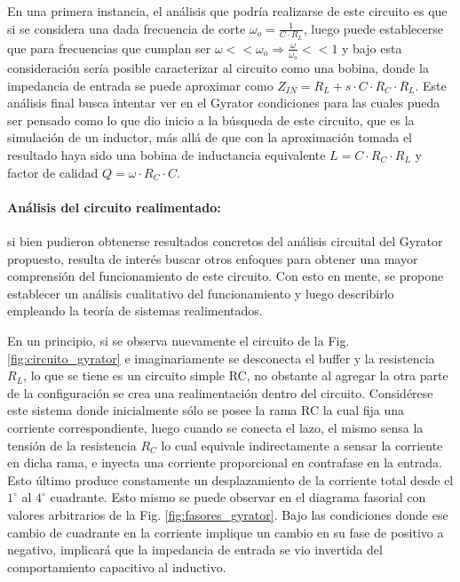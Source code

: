 En una primera instancia, el an\'alisis que podr\'ia realizarse de este circuito es que si se considera una dada frecuencia de corte 
$\omega_o = \frac{1}{C \cdot R_L}$, luego puede establecerse que para frecuencias que cumplan ser $\omega << \omega_o \Rightarrow \frac{\omega}{\omega_o} << 1$ y bajo esta consideraci\'on
ser\'ia posible caracterizar al circuito como una bobina, donde la impedancia de entrada se puede aproximar como $Z_{IN} = R_L + s \cdot C \cdot R_C \cdot R_L$. Este an\'alisis final busca
intentar ver en el Gyrator condiciones para las cuales pueda ser pensado como lo que dio inicio a la b\'usqueda de este circuito, que es la simulaci\'on de un inductor, m\'as all\'a de que con la aproximaci\'on tomada
el resultado haya sido una bobina de inductancia equivalente $L = C \cdot R_C \cdot R_L$ y factor de calidad $Q = \omega \cdot R_C \cdot C$.

\paragraph*{An\'alisis del circuito realimentado:} si bien pudieron obtenerse resultados concretos del an\'alisis circuital del Gyrator propuesto, resulta de inter\'es buscar otros enfoques
para obtener una mayor comprensi\'on del funcionamiento de este circuito. Con esto en mente, se propone establecer un an\'alisis cualitativo del funcionamiento y luego describirlo empleando
la teor\'ia de sistemas realimentados.

En un principio, si se observa nuevamente el circuito de la Fig. \ref{fig:circuito_gyrator} e imaginariamente se desconecta el buffer y la resistencia $R_L$, lo que se tiene es un circuito simple RC,
no obstante al agregar la otra parte de la configuraci\'on se crea una realimentaci\'on dentro del circuito. Consid\'erese este sistema donde inicialmente s\'olo se posee la rama RC la cual fija una corriente correspondiente, luego cuando
se conecta el lazo, el mismo sensa la tensi\'on de la resistencia $R_C$ lo cual equivale indirectamente a sensar la corriente en dicha rama, e inyecta una corriente proporcional en contrafase en la entrada. Esto \'ultimo produce constamente un desplazamiento de la corriente
total desde el $1^{\circ}$ al $4^{\circ}$ cuadrante. Esto mismo se puede observar en el diagrama fasorial con valores arbitrarios de la Fig. \ref{fig:fasores_gyrator}. Bajo las condiciones donde ese cambio de cuadrante en la corriente implique un cambio en su fase de positivo a negativo,
implicar\'a que la impedancia de entrada se vio invertida del comportamiento capacitivo al inductivo.

